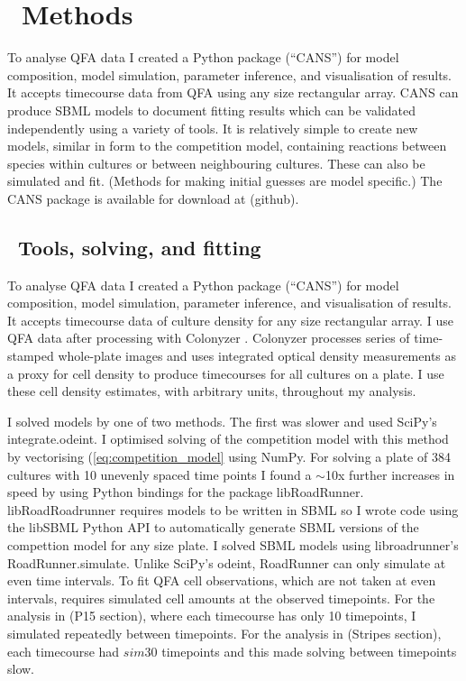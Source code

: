 \graphicspath{{images/}}

\section{\thesection~Methods}
\label{sec:methods}

To analyse QFA data I created a Python package (``CANS'') for model
composition, model simulation, parameter inference, and visualisation
of results. It accepts timecourse data from QFA using any size
rectangular array. CANS can produce SBML models to document fitting
results which can be validated independently using a variety of
tools. It is relatively simple to create new models, similar in form
to the competition model, containing reactions between species within
cultures or between neighbouring cultures. These can also be simulated
and fit. (Methods for making initial guesses are model specific.) The
CANS package is available for download at (github).

\subsection{\thesubsection~Tools, solving, and fitting}

To analyse QFA data I created a Python package (``CANS'') for model
composition, model simulation, parameter inference, and visualisation
of results. It accepts timecourse data of culture density for any size
rectangular array. I use QFA data after processing with Colonyzer
\citep{Lawless2010}. Colonyzer processes series of time-stamped
whole-plate images and uses integrated optical density measurements as
a proxy for cell density to produce timecourses for all cultures on a
plate. I use these cell density estimates, with arbitrary units,
throughout my analysis.


I solved models by one of two methods. The first was slower and used
SciPy's integrate.odeint. I optimised solving of the competition model
with this method by vectorising (\ref{eq:competition_model} using
NumPy. For solving a plate of 384 cultures with 10 unevenly spaced
time points I found a \(\sim\)10x further increases in speed by using
Python bindings for the package libRoadRunner. libRoadRoadrunner
requires models to be written in SBML so I wrote code using the
libSBML Python API to automatically generate SBML versions of the
compettion model for any size plate.
I solved SBML models using libroadrunner's RoadRunner.simulate. Unlike
SciPy's odeint, RoadRunner can only simulate at even time intervals.
To fit QFA cell observations, which are not taken at even intervals,
requires simulated cell amounts at the observed timepoints. For the
analysis in (P15 section), where each timecourse has only 10
timepoints, I simulated repeatedly between timepoints. For the
analysis in (Stripes section), each timecourse had \(sim\)30
timepoints and this made solving between timepoints slow.

